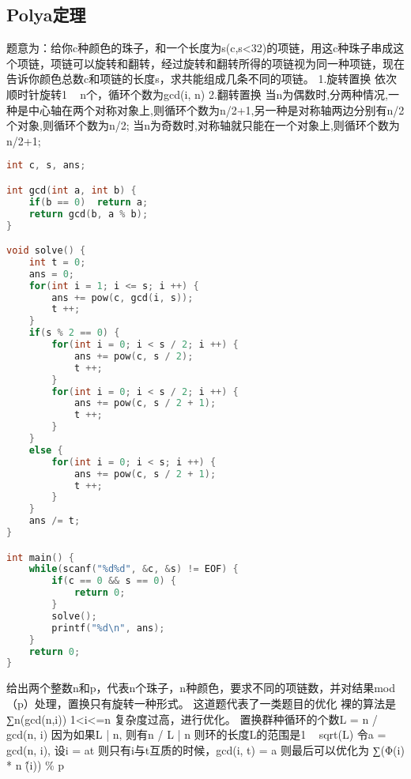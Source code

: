 \subsection{Polya定理}
题意为：给你c种颜色的珠子，和一个长度为s(c,s<32)的项链，用这c种珠子串成这个项链，项链可以旋转和翻转，经过旋转和翻转所得的项链视为同一种项链，现在告诉你颜色总数c和项链的长度s，求共能组成几条不同的项链。
1.旋转置换
    依次顺时针旋转1 ~ n个，循环个数为gcd(i, n)
2.翻转置换
    当n为偶数时,分两种情况,一种是中心轴在两个对称对象上,则循环个数为n/2+1,另一种是对称轴两边分别有n/2个对象,则循环个数为n/2;
    当n为奇数时,对称轴就只能在一个对象上,则循环个数为n/2+1;
    \begin{lstlisting}[language=c++]
int c, s, ans;

int gcd(int a, int b) {
    if(b == 0)  return a;
    return gcd(b, a % b);
}

void solve() {
    int t = 0;
    ans = 0;
    for(int i = 1; i <= s; i ++) {
        ans += pow(c, gcd(i, s));
        t ++;
    }
    if(s % 2 == 0) {
        for(int i = 0; i < s / 2; i ++) {
            ans += pow(c, s / 2);
            t ++;
        }
        for(int i = 0; i < s / 2; i ++) {
            ans += pow(c, s / 2 + 1);
            t ++;
        }
    }
    else {
        for(int i = 0; i < s; i ++) {
            ans += pow(c, s / 2 + 1);
            t ++;
        }
    }
    ans /= t;
}

int main() {
    while(scanf("%d%d", &c, &s) != EOF) {
        if(c == 0 && s == 0) {
            return 0;
        }
        solve();
        printf("%d\n", ans);
    }
    return 0;
}
    \end{lstlisting}
给出两个整数n和p，代表n个珠子，n种颜色，要求不同的项链数，并对结果mod（p）处理，置换只有旋转一种形式。
这道题代表了一类题目的优化
裸的算法是 ∑n(gcd(n,i)) 1<i<=n
复杂度过高，进行优化。
置换群种循环的个数L = n / gcd(n, i)
因为如果L | n, 则有n / L | n
则环的长度L的范围是1 ~ sqrt(L)
令a = gcd(n, i), 设i = at
则只有i与t互质的时候，gcd(i, t) = a
则最后可以优化为 ∑(Φ(i) * n \^ (i)) \% p

